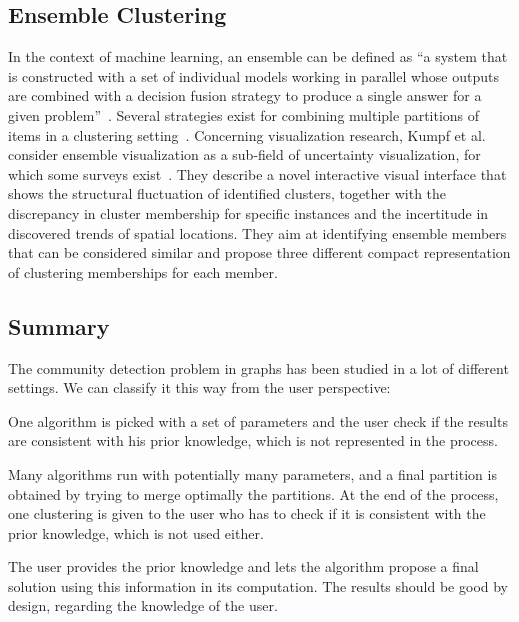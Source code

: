 

\subsection{Ensemble Clustering}
In the context of machine learning, an ensemble can be defined as ``a system that is constructed with a set of individual models working in parallel whose outputs are combined with a decision fusion strategy to produce a single answer for a given problem''~\cite{wang08}. Several strategies exist for combining multiple partitions of items in a clustering setting~\cite{strehl2002cluster}.
Concerning visualization research, Kumpf et al.~\cite{kumpf18} consider ensemble visualization as a sub-field of uncertainty visualization, for which some surveys exist~\cite{Bonneau2014, maceachren05}. They describe a novel interactive visual interface that shows the structural fluctuation of identified clusters, together with the discrepancy in cluster membership for specific instances and the incertitude in discovered trends of spatial locations.
They aim at identifying ensemble members that can be considered similar and propose three different compact representation of clustering memberships for each member.

\subsection{Summary}\label{sec:summary}

The community detection problem in graphs has been studied in a lot of different settings. We can classify it this way from the user perspective:
\begin{description}[leftmargin=0pt,nosep]
\item [Standard clustering.] One algorithm is picked with a set of parameters and the user check if the results are consistent with his prior knowledge, which is not represented in the process.
\item [Ensemble clustering.] Many algorithms run with potentially many parameters, and a final partition is obtained by trying to merge optimally the partitions. At the end of the process, one clustering is given to the user who has to check if it is consistent with the prior knowledge, which is not used either.
\item [Semi-supervised clustering.] The user provides the prior knowledge and lets the algorithm propose a final solution using this information in its computation. The results should be good by design, regarding the knowledge of the user.
\end{description}

